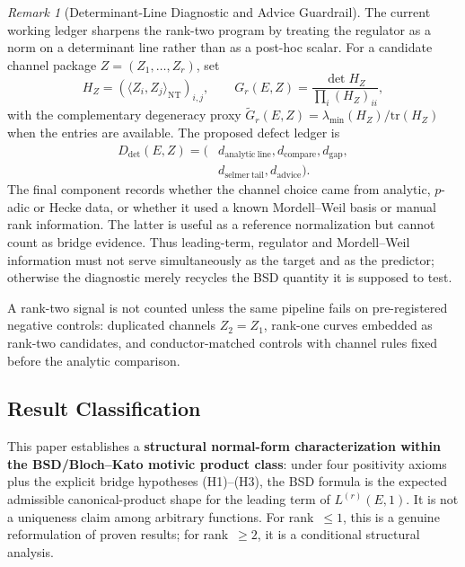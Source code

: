\documentclass[aps,prd,twocolumn,superscriptaddress,nofootinbib,floatfix]{revtex4-2}
\theoremstyle{definition}
\theoremstyle{remark}
\newtheorem{remark}[theorem]{Remark}
\begin{document}
\begin{remark}[Determinant-Line Diagnostic and Advice Guardrail]
\label{rem:det-line-diagnostic}
The current working ledger sharpens the rank-two program by treating the
regulator as a norm on a determinant line rather than as a post-hoc scalar.
For a candidate channel package $Z=(Z_1,\ldots,Z_r)$, set
\[
H_Z=(\langle Z_i,Z_j\rangle_{\mathrm{NT}})_{i,j},\qquad
G_r(E,Z)=\frac{\det H_Z}{\prod_i (H_Z)_{ii}},
\]
with the complementary degeneracy proxy
$\widetilde G_r(E,Z)=\lambda_{\min}(H_Z)/\mathrm{tr}(H_Z)$ when the entries
are available. The proposed defect ledger is
\[
\begin{aligned}
D_{\det}(E,Z)=(&d_{\mathrm{analytic\ line}},d_{\mathrm{compare}},d_{\mathrm{gap}},\\
&d_{\mathrm{selmer\ tail}},d_{\mathrm{advice}}).
\end{aligned}
\]
The final component records whether the channel choice came from analytic,
$p$-adic or Hecke data, or whether it used a known Mordell--Weil basis or
manual rank information. The latter is useful as a reference normalization
but cannot count as bridge evidence. Thus leading-term, regulator and
Mordell--Weil information must not serve simultaneously as the target and as
the predictor; otherwise the diagnostic merely recycles the BSD quantity it
is supposed to test.

A rank-two signal is not counted unless the same pipeline fails on
pre-registered negative controls: duplicated channels $Z_2=Z_1$, rank-one
curves embedded as rank-two candidates, and conductor-matched controls with
channel rules fixed before the analytic comparison.
\end{remark}

\subsection*{Result Classification}

This paper establishes a \textbf{structural normal-form characterization within the BSD/Bloch--Kato motivic product class}: under four positivity axioms plus the explicit bridge hypotheses (H1)--(H3), the BSD formula is the expected admissible canonical-product shape for the leading term of $L^{(r)}(E,1)$. It is not a uniqueness claim among arbitrary functions. For rank~$\leq 1$, this is a genuine reformulation of proven results; for rank~$\geq 2$, it is a conditional structural analysis.
\end{document}
